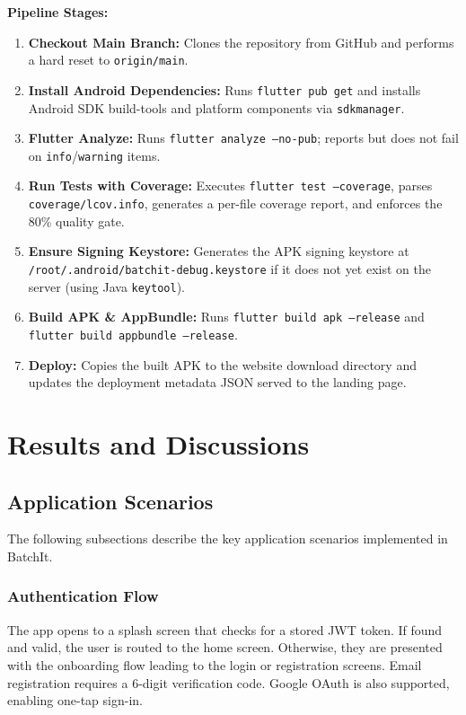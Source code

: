 \documentclass[12pt, a4paper]{report}
\begin{document}
\textbf{Pipeline Stages:}
\begin{enumerate}[leftmargin=*, label=\textcolor{batchitGreen}{\textbf{\arabic*.}}]
  \item \textbf{Checkout Main Branch:} Clones the repository from GitHub and performs a hard reset to \texttt{origin/main}.
  \item \textbf{Install Android Dependencies:} Runs \texttt{flutter pub get} and installs Android SDK build-tools and platform components via \texttt{sdkmanager}.
  \item \textbf{Flutter Analyze:} Runs \texttt{flutter analyze --no-pub}; reports but does not fail on \texttt{info}/\texttt{warning} items.
  \item \textbf{Run Tests with Coverage:} Executes \texttt{flutter test --coverage}, parses \texttt{coverage/lcov.info}, generates a per-file coverage report, and enforces the 80\% quality gate.
  \item \textbf{Ensure Signing Keystore:} Generates the APK signing keystore at \texttt{/root/.android/batchit-debug.keystore} if it does not yet exist on the server (using Java \texttt{keytool}).
  \item \textbf{Build APK \& AppBundle:} Runs \texttt{flutter build apk --release} and \texttt{flutter build appbundle --release}.
  \item \textbf{Deploy:} Copies the built APK to the website download directory and updates the deployment metadata JSON served to the landing page.
\end{enumerate}

\chapter{Results and Discussions}

\section{Application Scenarios}

The following subsections describe the key application scenarios implemented in BatchIt.

\subsection{Authentication Flow}
The app opens to a splash screen that checks for a stored JWT token. If found and valid, the user is routed to the home screen. Otherwise, they are presented with the onboarding flow leading to the login or registration screens. Email registration requires a 6-digit verification code. Google OAuth is also supported, enabling one-tap sign-in.
\end{document}
